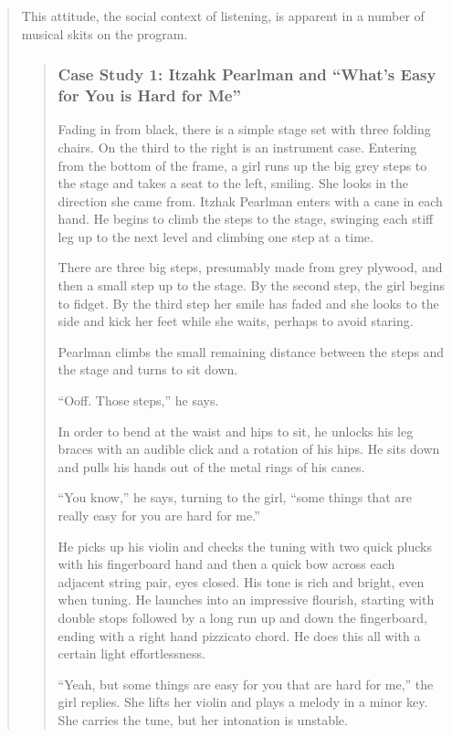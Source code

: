 \documentclass[12pt,letterpaper]{article}
\begin{document}
\begin{quote}
	This attitude, the social context of listening, is apparent in a number 
	of musical skits on the program.  


	\begin{quote}
	\subsubsection*{Case Study 1: Itzahk Pearlman and ``What's Easy for You
	 is Hard for Me''}

	Fading in from black, there is a simple stage set with three folding 
	chairs. On the third to the right is an instrument case. Entering from 
	the bottom of the frame, a girl runs up the big grey steps to the stage 
	and takes a seat to the left, smiling. She looks in the direction she 
	came from. Itzhak Pearlman enters with a cane in each hand. He begins 
	to climb the steps to the stage, swinging each stiff leg up to the next
	level and climbing one step at a time. 

	There are three big steps, presumably made from grey plywood, and then a
	small step up to the stage. By the second step, the girl begins to 
	fidget. By the third step her smile has faded and she looks to the side
	and kick her feet while she waits, perhaps to avoid staring.   

	Pearlman climbs the small remaining distance between the steps and the 
	stage and turns to sit down. 

	``Ooff. Those steps,'' he says.

	In order to bend at the waist and hips to sit, he unlocks his leg 
	braces with an audible click and a rotation of his hips. He sits down 
	and pulls his hands out of the metal rings of his canes.

	``You know,'' he says, turning to the girl, ``some things that are 
	really easy for you are hard for me.''

	He picks up his violin and checks the tuning with two quick plucks with 
	his fingerboard hand and then a quick bow across each adjacent string
	pair, eyes closed. His tone is rich and bright, even when tuning. He 
	launches into an impressive flourish, starting with double stops 
	followed by a long run up and down the fingerboard, ending with a right
	hand pizzicato chord. He does this all with a certain light 
	effortlessness.

	``Yeah, but some things are easy for you that are hard for me,'' the 
	girl replies. She lifts her violin and plays a melody in a minor key.
	She 
	carries the tune, but her intonation is unstable. 


\end{quote}
\end{quote}
\end{document}
